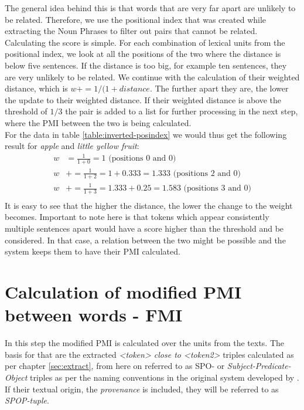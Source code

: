 The general idea behind this is that words that are very far apart are unlikely to be related. Therefore, we use the positional index that was created while extracting the Noun Phrases to filter out pairs that cannot be related.\\
Calculating the score is simple. For each combination of lexical units from the positional index, we look at all the positions of the two where the distance is below five sentences. If the distance is too big, for example ten sentences, they are very unlikely to be related. We continue with the calculation of their weighted distance, which is \(w += 1/(1 + distance\). The further apart they are, the lower the update to their weighted distance. If their weighted distance is above the threshold of \(1/3\) the pair is added to a list for further processing in the next step, where the PMI between the two is being calculated.\\
For the data in table \ref{table:inverted-posindex} we would thus get the following result for \textit{apple} and \textit{little yellow fruit}:
\begin{equation}\label{gather:weighteddistance}
\begin{aligned}
w &= \frac{1}{1+0} = 1 \text{ (positions 0 and 0)} \\ 
w &+= \frac{1}{1+2} = 1 + 0.333 = 1.333 \text{ (positions 2 and 0)}\\
w &+= \frac{1}{1+3} = 1.333 + 0.25 = 1.583 \text{ (positions 3 and 0)}\\
\end{aligned}
\end{equation}
It is easy to see that the higher the distance, the lower the change to the weight becomes. Important to note here is that tokens which appear consistently multiple sentences apart would have a score higher than the threshold and be considered. In that case, a relation between the two might be possible and the system keeps them to have their PMI calculated.

\section{Calculation of modified PMI between words - FMI}\label{sec:kbcreate}
In this step the modified PMI is calculated over the units from the texts. The basis for that are the extracted \textit{<token> close to <token2>} triples calculated as per chapter \ref{sec:extract}, from here on referred to as SPO- or \textit{Subject-Predicate-Object} triples as per the naming conventions in the original system developed by \cite{novavcek2014skimmr}. If their textual origin, the \textit{provenance} is included, they will be referred to as \textit{SPOP-tuple}.\\

